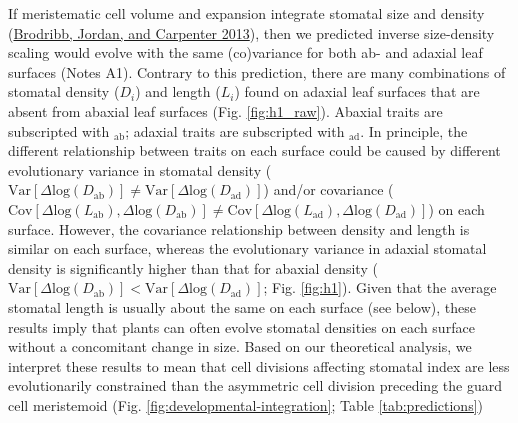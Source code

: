 \documentclass[
  12pt,
]{article}
\begin{document}
If meristematic cell volume and expansion integrate stomatal size and density (\protect\hyperlink{ref-brodribb_unified_2013}{Brodribb, Jordan, and Carpenter 2013}), then we predicted inverse size-density scaling would evolve with the same (co)variance for both ab- and adaxial leaf surfaces (Notes A1). Contrary to this prediction, there are many combinations of stomatal density (\(D_i\)) and length (\(L_i\)) found on adaxial leaf surfaces that are absent from abaxial leaf surfaces (Fig. \ref{fig:h1_raw}). Abaxial traits are subscripted with \(_{\textrm{ab}}\); adaxial traits are subscripted with \(_{\textrm{ad}}\). In principle, the different relationship between traits on each surface could be caused by different evolutionary variance in stomatal density (\(\text{Var}[\Delta \text{log}(D_\text{ab})] \ne \text{Var}[\Delta \text{log}(D_\text{ad})]\)) and/or covariance (\(\text{Cov}[\Delta \text{log}(L_\text{ab}), \Delta \text{log}(D_\text{ab})] \ne \text{Cov}[\Delta \text{log}(L_\text{ad}), \Delta \text{log}(D_\text{ad})]\)) on each surface. However, the covariance relationship between density and length is similar on each surface, whereas the evolutionary variance in adaxial stomatal density is significantly higher than that for abaxial density (\(\text{Var}[\Delta \text{log}(D_\text{ab})] < \text{Var}[\Delta \text{log}(D_\text{ad})]\); Fig. \ref{fig:h1}). Given that the average stomatal length is usually about the same on each surface (see below), these results imply that plants can often evolve stomatal densities on each surface without a concomitant change in size. Based on our theoretical analysis, we interpret these results to mean that cell divisions affecting stomatal index are less evolutionarily constrained than the asymmetric cell division preceding the guard cell meristemoid (Fig. \ref{fig:developmental-integration}; Table \ref{tab:predictions})
\end{document}
